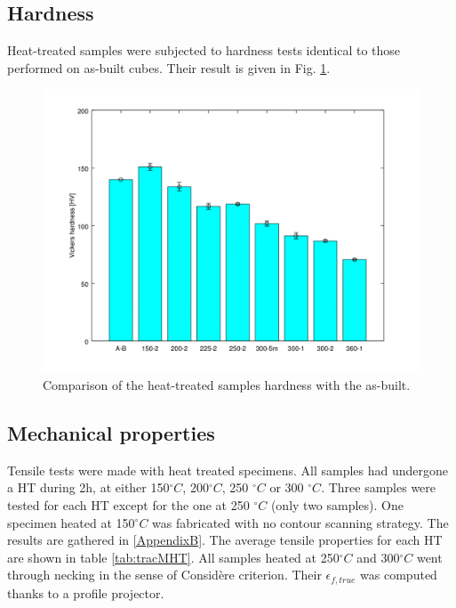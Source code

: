 \subsection{Hardness}

Heat-treated samples were subjected to hardness tests identical to those performed on as-built cubes. Their result is given in Fig. \ref{fig:hardness}.

\begin{figure}[ht]
	\centering
	\centerline{\includegraphics[scale=0.6]{Images/hardness.png}}
	\decoRule
	\caption[Comparison of the heat-treated samples hardness with the as-built.]{Comparison of the heat-treated samples hardness with the as-built.}
	\label{fig:hardness}
\end{figure}


\subsection{Mechanical properties}

Tensile tests were made with heat treated specimens. All samples had undergone a HT during 2h, at either 150$^\circ C$, 200$^\circ C$, 250 $^\circ C$ or 300 $^\circ C$. Three samples were tested for each HT except for the one at 250 $^\circ C$ (only two samples). One specimen heated at 150$^\circ C$ was fabricated with no contour scanning strategy. The results are gathered in \ref{AppendixB}. The average tensile properties for each HT are shown in table \ref{tab:tracMHT}. All samples heated at 250$^\circ C$ and 300$^\circ C$ went through necking in the sense of Considère criterion. Their $\epsilon_{f,true}$ was computed thanks to a profile projector. \\

